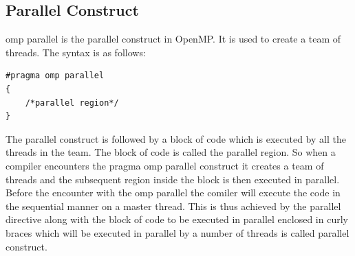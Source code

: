 \documentclass[12pt]{article}
\begin{document}
\subsection{Parallel Construct}

omp parallel is the parallel construct in OpenMP. 
It is used to create a team of threads. The syntax is as follows:
\begin{lstlisting}
#pragma omp parallel
{
    /*parallel region*/
}
\end{lstlisting}
The parallel construct is followed by a block of code which is executed by all the threads in the team. 
The block of code is called the parallel region. So when a compiler encounters the pragma omp parallel construct it creates a team of 
threads and the subsequent region inside the block is then executed in parallel. Before the encounter with the omp parallel the comiler will execute the code in 
the sequential manner on a master thread. This is thus achieved by the parallel directive along with the block of code to be executed in parallel enclosed in curly braces which will be executed in parallel by a number of threads is 
called parallel construct.
\end{document}
